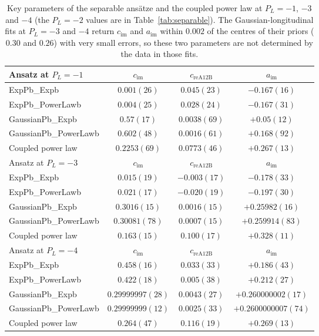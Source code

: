 \begin{table}[!t]
\caption{Key parameters of the separable ansätze and the coupled power law at $P_L=-1$, $-3$ and $-4$ (the $P_L=-2$ values are in Table~\ref{tab:separable}). The Gaussian-longitudinal fits at $P_L=-3$ and $-4$ return $c_{\text{im}}$ and $a_{\text{im}}$ within $0.002$ of the centres of their priors ($0.30$ and $0.26$) with very small errors, so these two parameters are not determined by the data in those fits.}
\label{tab:separable_params_app}
\scriptsize
\setlength{\tabcolsep}{2pt}
\begin{ruledtabular}
\begin{tabular}{lccc}
Ansatz at $P_L=-1$ & $c_{\text{im}}$ & $c_{\text{reA12B}}$ & $a_{\text{im}}$ \\
\hline
ExpPb\_Expb & $0.001(26)$ & $0.045(23)$ & $-0.167(16)$ \\
ExpPb\_PowerLawb & $0.004(25)$ & $0.028(24)$ & $-0.167(31)$ \\
GaussianPb\_Expb & $0.57(17)$ & $0.0038(69)$ & $+0.05(12)$ \\
GaussianPb\_PowerLawb & $0.602(48)$ & $0.0016(61)$ & $+0.168(92)$ \\
Coupled power law & $0.2253(69)$ & $0.0773(46)$ & $+0.267(13)$ \\
\hline
Ansatz at $P_L=-3$ & $c_{\text{im}}$ & $c_{\text{reA12B}}$ & $a_{\text{im}}$ \\
\hline
ExpPb\_Expb & $0.015(19)$ & $-0.003(17)$ & $-0.178(33)$ \\
ExpPb\_PowerLawb & $0.021(17)$ & $-0.020(19)$ & $-0.197(30)$ \\
GaussianPb\_Expb & $0.3016(15)$ & $0.0016(15)$ & $+0.25982(16)$ \\
GaussianPb\_PowerLawb & $0.30081(78)$ & $0.0007(15)$ & $+0.259914(83)$ \\
Coupled power law & $0.163(15)$ & $0.100(17)$ & $+0.328(11)$ \\
\hline
Ansatz at $P_L=-4$ & $c_{\text{im}}$ & $c_{\text{reA12B}}$ & $a_{\text{im}}$ \\
\hline
ExpPb\_Expb & $0.458(16)$ & $0.033(33)$ & $+0.186(43)$ \\
ExpPb\_PowerLawb & $0.422(18)$ & $0.005(38)$ & $+0.212(27)$ \\
GaussianPb\_Expb & $0.29999997(28)$ & $0.0043(27)$ & $+0.260000002(17)$ \\
GaussianPb\_PowerLawb & $0.29999999(12)$ & $0.0025(33)$ & $+0.2600000007(74)$ \\
Coupled power law & $0.264(47)$ & $0.116(19)$ & $+0.269(13)$ \\
\end{tabular}
\end{ruledtabular}
\end{table}
